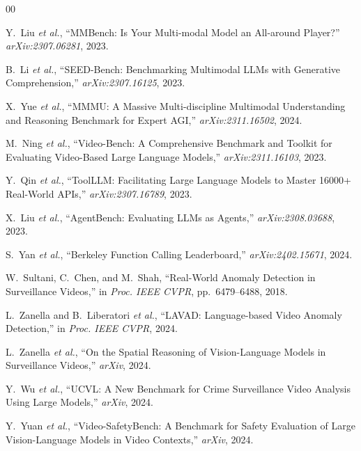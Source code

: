 \documentclass[conference]{IEEEtran}
\begin{document}
\begin{thebibliography}{00}

Y.~Liu \textit{et al.}, ``MMBench: Is Your Multi-modal Model an
All-around Player?'' \textit{arXiv:2307.06281}, 2023.

B.~Li \textit{et al.}, ``SEED-Bench: Benchmarking Multimodal LLMs with
Generative Comprehension,'' \textit{arXiv:2307.16125}, 2023.

X.~Yue \textit{et al.}, ``MMMU: A Massive Multi-discipline Multimodal
Understanding and Reasoning Benchmark for Expert AGI,''
\textit{arXiv:2311.16502}, 2024.

M.~Ning \textit{et al.}, ``Video-Bench: A Comprehensive Benchmark and
Toolkit for Evaluating Video-Based Large Language Models,''
\textit{arXiv:2311.16103}, 2023.

Y.~Qin \textit{et al.}, ``ToolLLM: Facilitating Large Language Models
to Master 16000+ Real-World APIs,'' \textit{arXiv:2307.16789}, 2023.

X.~Liu \textit{et al.}, ``AgentBench: Evaluating LLMs as Agents,''
\textit{arXiv:2308.03688}, 2023.

S.~Yan \textit{et al.}, ``Berkeley Function Calling Leaderboard,''
\textit{arXiv:2402.15671}, 2024.

W.~Sultani, C.~Chen, and M.~Shah, ``Real-World Anomaly Detection in
Surveillance Videos,'' in \textit{Proc. IEEE CVPR}, pp.~6479--6488, 2018.

L.~Zanella and B.~Liberatori \textit{et al.}, ``LAVAD: Language-based
Video Anomaly Detection,'' in \textit{Proc. IEEE CVPR}, 2024.

L.~Zanella \textit{et al.}, ``On the Spatial Reasoning of
Vision-Language Models in Surveillance Videos,'' \textit{arXiv}, 2024.

Y.~Wu \textit{et al.}, ``UCVL: A New Benchmark for Crime Surveillance
Video Analysis Using Large Models,'' \textit{arXiv}, 2024.

Y.~Yuan \textit{et al.}, ``Video-SafetyBench: A Benchmark for Safety
Evaluation of Large Vision-Language Models in Video Contexts,''
\textit{arXiv}, 2024.


\end{thebibliography}
\end{document}
